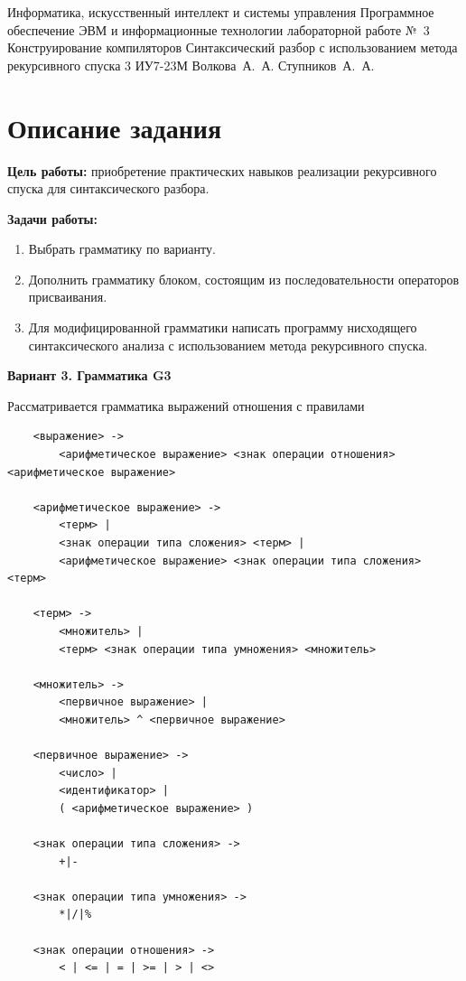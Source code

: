 \documentclass{bmstu-gost-7-32}
\begin{document}
\makereporttitle
	{Информатика, искусственный интеллект и системы управления} %
	{Программное обеспечение ЭВМ и информационные технологии} %
	{лабораторной работе №~3} %
	{Конструирование компиляторов} %
	{Синтаксический разбор с использованием метода рекурсивного спуска} %
	{3} %
	{ИУ7-23М} %
	{Волкова~А.~А.} %
	{Ступников~А.~А.} %

\section*{Описание задания}

\textbf{Цель работы:} приобретение практических навыков реализации рекурсивного спуска для синтаксического разбора.

\textbf{Задачи работы:}
\begin{enumerate}
	\item Выбрать грамматику по варианту.
	\item Дополнить грамматику блоком, состоящим из последовательности операторов присваивания.
	\item Для модифицированной грамматики написать программу нисходящего синтаксического анализа с использованием метода рекурсивного спуска.
\end{enumerate}

\textbf{Вариант 3. Грамматика G3}

Рассматривается грамматика выражений отношения с правилами

\begin{verbatim}
	<выражение> ->
	    <арифметическое выражение> <знак операции отношения> <арифметическое выражение>

	<арифметическое выражение> ->
	    <терм> |
	    <знак операции типа сложения> <терм> |
	    <арифметическое выражение> <знак операции типа сложения> <терм>

	<терм> ->
	    <множитель> |
	    <терм> <знак операции типа умножения> <множитель>

	<множитель> ->
	    <первичное выражение> |
	    <множитель> ^ <первичное выражение>

	<первичное выражение> ->
	    <число> |
	    <идентификатор> |
	    ( <арифметическое выражение> )

	<знак операции типа сложения> ->
	    +|-

	<знак операции типа умножения> ->
	    *|/|%

	<знак операции отношения> ->
	    < | <= | = | >= | > | <>
\end{verbatim}
\end{document}
